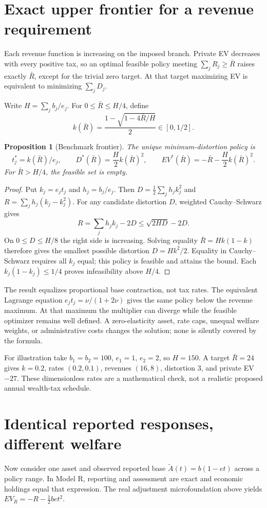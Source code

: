 \documentclass[11pt]{article}
\newtheorem{proposition}{Proposition}
\begin{document}
\section*{Exact upper frontier for a revenue requirement}
Each revenue function is increasing on the imposed branch. Private EV decreases with every positive tax, so an optimal feasible policy meeting $\sum_jR_j\geq\bar R$ raises exactly $\bar R$, except for the trivial zero target. At that target maximizing EV is equivalent to minimizing $\sum_jD_j$.

Write $H=\sum_jb_j/e_j$. For $0\leq\bar R\leq H/4$, define
\[
 k(\bar R)=\frac{1-\sqrt{1-4\bar R/H}}2\in[0,1/2].
\]
\begin{proposition}[Benchmark frontier]
The unique minimum-distortion policy is
\[
 t_j^*=k(\bar R)/e_j,
 \qquad
 D^*(\bar R)=\frac H2k(\bar R)^2,
 \qquad
 EV^*(\bar R)=-\bar R-\frac H2k(\bar R)^2.
\]
For $\bar R>H/4$, the feasible set is empty.
\end{proposition}
\begin{proof}
Put $k_j=e_jt_j$ and $h_j=b_j/e_j$. Then $D=\tfrac12\sum_jh_jk_j^2$ and $R=\sum_jh_j(k_j-k_j^2)$. For any candidate distortion $D$, weighted Cauchy--Schwarz gives
\[
 R=\sum_jh_jk_j-2D\leq\sqrt{2HD}-2D.
\]
On $0\leq D\leq H/8$ the right side is increasing. Solving equality $\bar R=Hk(1-k)$ therefore gives the smallest possible distortion $D=Hk^2/2$. Equality in Cauchy--Schwarz requires all $k_j$ equal; this policy is feasible and attains the bound. Each $k_j(1-k_j)\leq1/4$ proves infeasibility above $H/4$.
\end{proof}

The result equalizes proportional base contraction, not tax rates. The equivalent Lagrange equation $e_jt_j=\nu/(1+2\nu)$ gives the same policy below the revenue maximum. At that maximum the multiplier can diverge while the feasible optimizer remains well defined. A zero-elasticity asset, rate caps, unequal welfare weights, or administrative costs changes the solution; none is silently covered by the formula.

For illustration take $b_1=b_2=100$, $e_1=1$, $e_2=2$, so $H=150$. A target $\bar R=24$ gives $k=0.2$, rates $(0.2,0.1)$, revenues $(16,8)$, distortion $3$, and private EV $-27$. These dimensionless rates are a mathematical check, not a realistic proposed annual wealth-tax schedule.

\section*{Identical reported responses, different welfare}
Now consider one asset and observed reported base $\widetilde A(t)=b(1-et)$ across a policy range. In Model R, reporting and assessment are exact and economic holdings equal that expression. The real adjustment microfoundation above yields $EV_R=-R-\tfrac12bet^2$.
\end{document}
